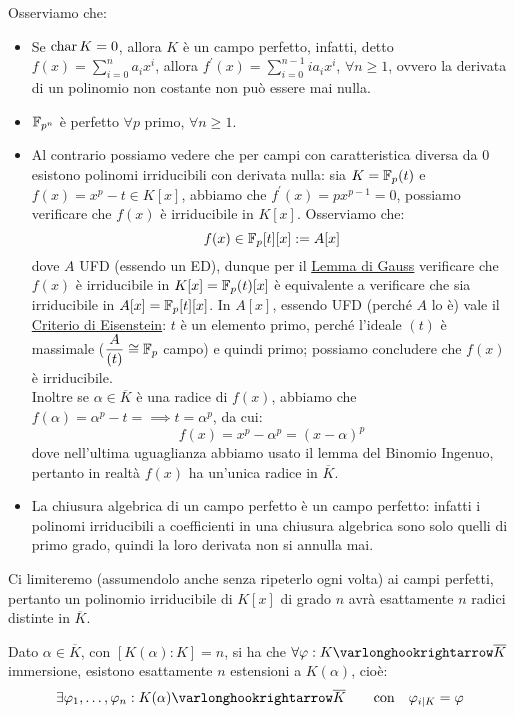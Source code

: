 \documentclass[11pt]{scrartcl}
\begin{document}
\begin{remark}
    Osserviamo che:
    \begin{itemize}
        \item Se $\text{char}\, K = 0$, allora $K$ è un campo perfetto, infatti, detto $f(x) = \sum_{i=0}^n a_ix^i$, allora $f^{\prime}(x) = \sum_{i=0}^{n-1} ia_ix^i$, $\forall n \geq 1$, ovvero la derivata di un polinomio non 
        costante non può essere mai nulla.
        \item $\mathbb{F}_{p^{n}}$ è perfetto $\forall p$ primo, $\forall n \geq 1$.
        \item Al contrario possiamo vedere che per campi con caratteristica diversa da 0 esistono polinomi irriducibili con derivata nulla:
	sia $K = {\mathbb F}_p(t)$ e $f(x) = x^p - t \in K[x]$, abbiamo che $f^{\prime}(x) = px^{p-1} = 0$,
        possiamo verificare che $f(x)$ è irriducibile in $K[x]$. Osserviamo che:
        \[ f(x) \in {\mathbb F}_p[t][x] := A[x]
            \]
        dove $A$ UFD (essendo un ED), dunque per il \hyperref[gauss]{Lemma di Gauss} verificare che $f(x)$ è irriducibile in $K[x] = {\mathbb F}_p(t)[x]$ è equivalente a verificare che sia irriducibile in $A[x] = {\mathbb F}_p[t][x]$.
        In $A[x]$, essendo UFD (perché $A$ lo è) vale il \hyperref[eisenstein]{Criterio di Eisenstein}:
	$t$ è un elemento primo, perché l'ideale $(t)$ è massimale ($\displaystyle\frac{A}{(t)} \cong {\mathbb F}_p$ campo) e quindi primo;
	possiamo concludere che $f(x)$ è irriducibile. \\
        Inoltre se $\alpha \in \overline K$ è una radice di $f(x)$, abbiamo che $f(\alpha) = \alpha^p - t = \implies t = \alpha^p$, da cui:
        \[ f(x) = x^p - \alpha^p = (x - \alpha)^p
            \]
        dove nell'ultima uguaglianza abbiamo usato il lemma del Binomio Ingenuo, pertanto in realtà $f(x)$ ha un'unica radice in $\overline K$.
	\item La chiusura algebrica di un campo perfetto è un campo perfetto: 
        infatti i polinomi irriducibili a coefficienti in una chiusura algebrica sono solo quelli di primo grado, quindi la loro derivata non si annulla mai.
    \end{itemize}
\end{remark}

Ci limiteremo (assumendolo anche senza ripeterlo ogni volta) ai campi perfetti, pertanto un polinomio irriducibile di $K[x]$ di grado $n$ avrà esattamente $n$ radici distinte in $\overline K$.

\begin{proposition}
    \label{3.37}
    Dato $\alpha \in \overline K$, con $[K(\alpha) : K] = n$, si ha che $\forall \varphi : K \varlonghookrightarrow \overline K$ immersione, esistono esattamente $n$ estensioni a $K(\alpha)$, cioè:
    \[ \exists \varphi_1,\ldots,\varphi_n : K(\alpha) \varlonghookrightarrow \overline K \qquad \text{con} \quad \varphi_{i|K} = \varphi
        \]
\end{proposition}
\end{document}
